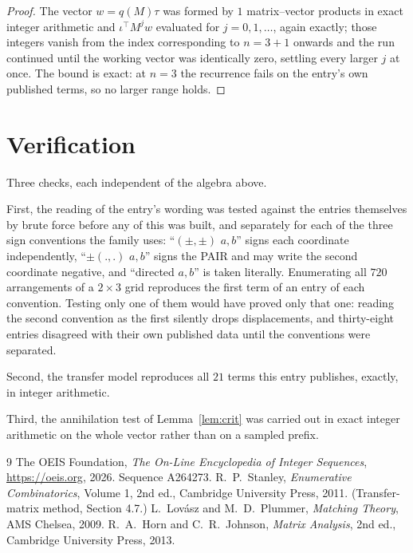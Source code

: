 \documentclass[11pt,a4paper]{article}
\theoremstyle{plain}
\theoremstyle{definition}
\begin{document}
\begin{proof}
The vector $w=q(M)\tau$ was formed by $1$ matrix--vector products in exact integer
arithmetic and $\iota^{\!\top}M^{j}w$ evaluated for $j=0,1,\dots$, again exactly; those
integers vanish from the index corresponding to $n=3+1$ onwards and the run continued
until the working vector was identically zero, settling every larger $j$ at once. The bound is exact: at $n=3$ the recurrence fails on the entry's own published terms, so no larger range holds.
\end{proof}

\section{Verification}

Three checks, each independent of the algebra above.

First, the reading of the entry's wording was tested against the entries themselves by brute
force before any of this was built, and separately for each of the three sign conventions the
family uses: ``$(\pm,\pm)$ $a,b$'' signs each coordinate independently, ``$\pm(.,.)$ $a,b$''
signs the PAIR and may write the second coordinate negative, and ``directed $a,b$'' is taken
literally. Enumerating all $720$ arrangements of a $2\times3$ grid reproduces the first term
of an entry of each convention. Testing only one of them would have proved only that one:
reading the second convention as the first silently drops displacements, and thirty-eight
entries disagreed with their own published data until the conventions were separated.

Second, the transfer model reproduces all $21$ terms this entry publishes, exactly, in
integer arithmetic.

Third, the annihilation test of Lemma~\ref{lem:crit} was carried out in exact integer
arithmetic on the whole vector rather than on a sampled prefix.

\begin{thebibliography}{9}
 The OEIS Foundation, \emph{The On-Line Encyclopedia of Integer
Sequences}, \url{https://oeis.org}, 2026. Sequence A264273.
 R.~P.~Stanley, \emph{Enumerative Combinatorics}, Volume 1, 2nd ed.,
Cambridge University Press, 2011. (Transfer-matrix method, Section 4.7.)
 L.~Lov\'asz and M.~D.~Plummer, \emph{Matching Theory}, AMS Chelsea, 2009.
 R.~A.~Horn and C.~R.~Johnson, \emph{Matrix Analysis}, 2nd ed., Cambridge
University Press, 2013.
\end{thebibliography}
\end{document}
